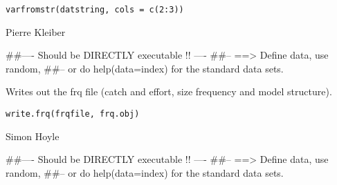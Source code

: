 \documentclass[a4paper]{book}
\begin{document}
%
\begin{Usage}
\begin{verbatim}
varfromstr(datstring, cols = c(2:3))
\end{verbatim}
\end{Usage}
%
\begin{Arguments}
\begin{ldescription}
\item[\code{datstring}] 


\item[\code{cols}] 


\end{ldescription}
\end{Arguments}
%
\begin{Author}\relax

Pierre Kleiber
\end{Author}
%
\begin{Examples}
\begin{ExampleCode}
##---- Should be DIRECTLY executable !! ----
##-- ==>  Define data, use random,
##--	or do  help(data=index)  for the standard data sets.

\end{ExampleCode}
\end{Examples}
%
\begin{Description}\relax

Writes out the frq file (catch and effort, size frequency and model structure). 
\end{Description}
%
\begin{Usage}
\begin{verbatim}
write.frq(frqfile, frq.obj)
\end{verbatim}
\end{Usage}
%
\begin{Arguments}
\begin{ldescription}
\item[\code{frqfile}] 


\item[\code{frq.obj}] 


\end{ldescription}
\end{Arguments}
%
\begin{Author}\relax

Simon Hoyle
\end{Author}
%
\begin{Examples}
\begin{ExampleCode}
##---- Should be DIRECTLY executable !! ----
##-- ==>  Define data, use random,
##--	or do  help(data=index)  for the standard data sets.

\end{ExampleCode}
\end{Examples}
\end{document}
